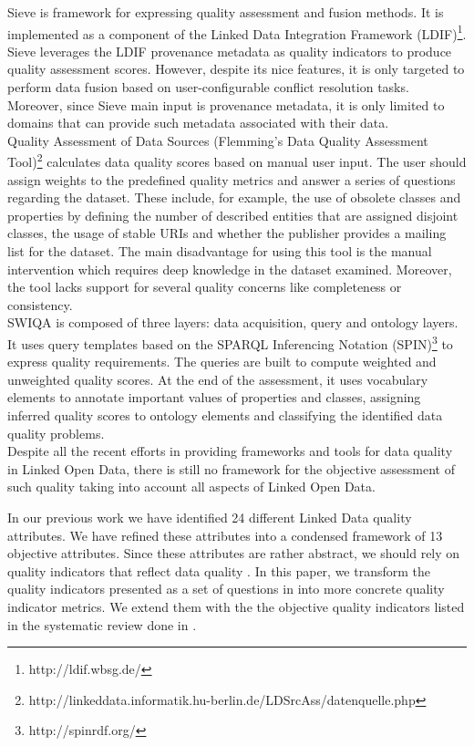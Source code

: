 \documentclass[onecolumn, crcready]{iosart2c}
\begin{document}
Sieve \cite{Mendes2012} is framework for expressing quality assessment and fusion methods. It is implemented as a component of the Linked Data Integration Framework (LDIF)\footnote{http://ldif.wbsg.de/}. Sieve leverages the LDIF provenance metadata as quality indicators to produce quality assessment scores. However, despite its nice features, it is only targeted to perform data fusion based on user-configurable conflict resolution tasks. Moreover, since Sieve main input is provenance metadata, it is only limited to domains that can provide such metadata associated with their data.\\


Quality Assessment of Data Sources (Flemming's Data Quality Assessment Tool)\footnote{http://linkeddata.informatik.hu-berlin.de/LDSrcAss/datenquelle.php} calculates data quality scores based on manual user input. The user should assign weights to the predefined quality metrics and answer a series of questions regarding the dataset. These include, for example, the use of obsolete classes and properties by defining the number of described entities that are assigned disjoint classes, the usage of stable URIs and whether the publisher provides a mailing list for the dataset. The main disadvantage for using this tool is the manual intervention which requires deep knowledge in the dataset examined. Moreover, the tool lacks support for several quality concerns like completeness or consistency.\\


SWIQA \cite{Furber2011a} is composed of three layers: data acquisition, query and ontology layers. It uses query templates based on the SPARQL Inferencing Notation (SPIN)\footnote{http://spinrdf.org/} to express quality requirements. The queries are built to compute weighted and unweighted quality scores. At the end of the assessment, it uses vocabulary elements to annotate important values of properties and classes, assigning inferred quality scores to ontology elements and classifying the identified data quality problems.\\

Despite all the recent efforts in providing frameworks and tools for data quality in Linked Open Data, there is still no framework for the objective assessment of such quality taking into account all aspects of Linked Open Data.

In our previous work \cite{assaf2012} we have identified 24 different Linked Data quality attributes. We have refined these attributes into a condensed framework of 13 objective attributes. Since these attributes are rather abstract, we should rely on quality indicators that reflect data quality \cite{flemming2010}. In this paper, we transform the quality indicators presented as a set of questions in \cite{assaf2012} into more concrete quality indicator metrics. We extend them with the the objective quality indicators listed in the systematic review done in \cite{Framework2012}.\\
\end{document}
